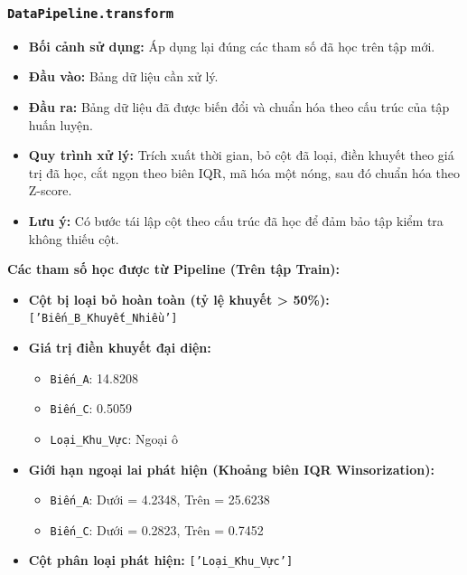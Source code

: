 \documentclass[a4paper]{article}
\newcommand{\code}[1]{\colorbox{light-gray}{\texttt{#1}}}
\begin{document}
\subsubsection{\code{DataPipeline.transform}}
\begin{itemize}[leftmargin=*]
    \item \textbf{Bối cảnh sử dụng:} Áp dụng lại đúng các tham số đã học trên tập mới.
    \item \textbf{Đầu vào:} Bảng dữ liệu cần xử lý.
    \item \textbf{Đầu ra:} Bảng dữ liệu đã được biến đổi và chuẩn hóa theo cấu trúc của tập huấn luyện.
    \item \textbf{Quy trình xử lý:} Trích xuất thời gian, bỏ cột đã loại, điền khuyết theo giá trị đã học, cắt ngọn theo biên IQR, mã hóa một nóng, sau đó chuẩn hóa theo Z-score.
    \item \textbf{Lưu ý:} Có bước tái lập cột theo cấu trúc đã học để đảm bảo tập kiểm tra không thiếu cột.
\end{itemize}
\begin{mdframed}[backgroundcolor=light-gray, roundcorner=5pt, hidealllines=true]
\textbf{Các tham số học được từ Pipeline (Trên tập Train):}
\begin{itemize}[leftmargin=*]
    \item \textbf{Cột bị loại bỏ hoàn toàn (tỷ lệ khuyết > 50\%):} \texttt{['Biến\_B\_Khuyết\_Nhiều']}
    \item \textbf{Giá trị điền khuyết đại diện:}
    \begin{itemize}
        \item \texttt{Biến\_A}: 14.8208
        \item \texttt{Biến\_C}: 0.5059
        \item \texttt{Loại\_Khu\_Vực}: Ngoại ô
    \end{itemize}
    \item \textbf{Giới hạn ngoại lai phát hiện (Khoảng biên IQR Winsorization):}
    \begin{itemize}
        \item \texttt{Biến\_A}: Dưới = 4.2348, Trên = 25.6238
        \item \texttt{Biến\_C}: Dưới = 0.2823, Trên = 0.7452
    \end{itemize}
    \item \textbf{Cột phân loại phát hiện:} \texttt{['Loại\_Khu\_Vực']}
\end{itemize}
\end{mdframed}
\end{document}
